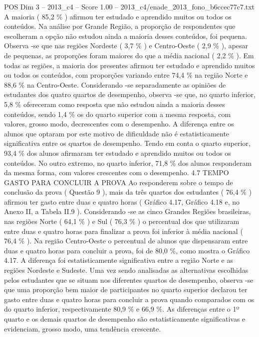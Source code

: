 \begin{textsample}{POS Dim 3 – 2013\_c4 – Score 1.00 – 2013\_c4/enade\_2013\_fono\_b6ccec77c7.txt}
A maioria ( 85,2 \% ) afirmou ter estudado e aprendido muitos ou todos os conteúdos.
Na análise por Grande Região, a proporção de respondentes que escolheram a opção não estudou ainda a maioria desses conteúdos, foi pequena.
Observa -se que nas regiões Nordeste ( 3,7 \% ) e Centro-Oeste ( 2,9 \% ), apesar de pequenas, as proporções foram maiores do que a média nacional ( 2,2 \% ).
Em todas as regiões, a maioria dos presentes afirmou ter estudado e aprendido muitos ou todos os conteúdos, com proporções variando entre 74,4 \% na região Norte e 88,6 \% na Centro-Oeste.
Considerando -se separadamente as opiniões de estudantes dos quatro quartos de desempenho, observa -se que, no quarto inferior, 5,8 \% ofereceram como resposta que não estudou ainda a maioria desses conteúdos, sendo 1,4 \% os do quarto superior com a mesma resposta, com valores, grosso modo, decrescentes com o desempenho.
A diferença entre os alunos que optaram por este motivo de dificuldade não é estatisticamente significativa entre os quartos de desempenho.
Tendo em conta o quarto superior, 93,4 \% dos alunos afirmaram ter estudado e aprendido muitos ou todos os conteúdos.
No outro extremo, no quarto inferior, 71,8 \% dos alunos responderam da mesma forma, com valores crescentes com o desempenho. 4.7 TEMPO GASTO PARA CONCLUIR A PROVA Ao responderem sobre o tempo de conclusão da prova ( Questão 9 ), mais da três quartos dos estudantes ( 76,4 \% ) afirmou ter gasto entre duas e quatro horas ( Gráfico 4.17, Gráfico 4.18 e, no Anexo II, a Tabela II.9 ).
Considerando -se as cinco Grandes Regiões brasileiras, nas regiões Norte ( 64,1 \% ) e Sul ( 76,3 \% ) o percentual dos que utilizaram entre duas e quatro horas para finalizar a prova foi inferior à média nacional ( 76,4 \% ).
Na região Centro-Oeste o percentual de alunos que dispensaram entre duas e quatro horas para concluir a prova, foi de 80,0 \%, como mostra o Gráfico 4.17.
A diferença foi estatisticamente significativa entre a região Norte e as regiões Nordeste e Sudeste.
Uma vez sendo analisadas as alternativas escolhidas pelos estudantes que se situam nos diferentes quartos de desempenho, observa -se que uma proporção bem maior de participantes no quarto superior declarou ter gasto entre duas e quatro horas para concluir a prova quando comparados com os do quarto inferior, respectivamente 80,9 \% e 66,9 \%.
As diferenças entre o 1º quarto e os demais quartos de desempenho são estatisticamente significativas e evidenciam, grosso modo, uma tendência crescente.

\end{textsample}
